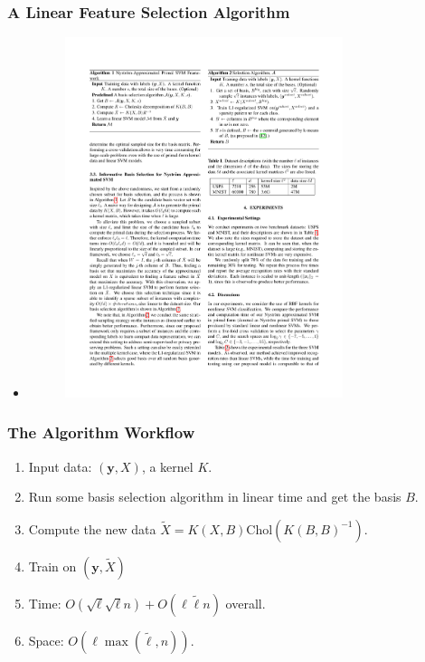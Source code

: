 \documentclass{beamer}
\def\by{{\boldsymbol y}}
\begin{document}
\begin{frame}
  \frametitle{A Linear Feature Selection Algorithm}
  \begin{itemize}
   \item []
    \begin{figure}
      \includegraphics[width=3.2in]{algo2.pdf}\\
    \end{figure}
  \end{itemize}
\end{frame}

\begin{frame}
  \frametitle{The Algorithm Workflow}
  \begin{enumerate}
    \item Input data: $(\by, X)$, a kernel $K$.
    \item Run some basis selection algorithm in linear time and get the basis $B$.
    \item Compute the new data $\tilde{X} = K(X, B) \text{Chol}(K(B, B)^{-1})$.
    \item Train on $(\by, \tilde{X})$
    \pause
    \item [] Time: $O(\sqrt{\ell} \sqrt{\ell} n) + O(\ell \tilde{\ell} n)$ overall.
    \item [] Space: $O(\ell \max(\tilde{\ell}, n))$.
  \end{enumerate}
\end{frame}

\end{document}
